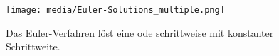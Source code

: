 \begin{frame}
	\frametitle{\insertsubsection}
	\begin{figure}
		\centering
		\texttt{[image: media/Euler-Solutions\_multiple.png]}
		\caption{Das Euler-Verfahren löst eine \ac{ode} schrittweise mit konstanter Schrittweite.}
	\end{figure}
\end{frame}



